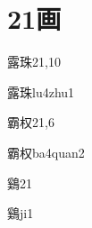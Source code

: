 
\section*{21画}

\begin{entry}{露珠}{21,10}
  \begin{phonetics}{露珠}{lu4zhu1}
  \end{phonetics}
\end{entry}

\begin{entry}{霸权}{21,6}
  \begin{phonetics}{霸权}{ba4quan2}
  \end{phonetics}
\end{entry}

\begin{entry}{鷄}{21}
  \begin{phonetics}{鷄}{ji1}
  \end{phonetics}
\end{entry}


